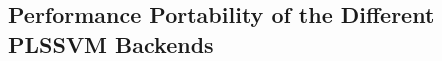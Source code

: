\subsection{Performance Portability of the Different PLSSVM Backends}

\cite{breyer_comparison_2022}
\cite{van_craen_plssvmparallel_2022}
\cite{van_craen_plssvmparallel_2022}